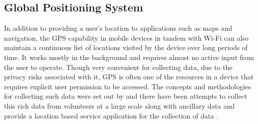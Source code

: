 \subsection{Global Positioning System}

In addition to providing a user’s location to applications such as maps and navigation, the GPS capability in mobile devices in tandem with Wi-Fi can also maintain a continuous list of locations visited by the device over long periods of time.
It works mostly in the background and requires almost no active input from the user to operate.
Though very convenient for collecting data, due to the privacy risks associated with it, GPS is often one of the resources in a device that requires explicit user permission to be accessed.
The concepts and methodologies for collecting such data were set out by \citep{asakura2004} and there have been attempts to collect this rich data from volunteers at a large scale along with ancillary data \citep{kiukkonen2010} and provide a location based service application for the collection of data \citep{ratti2006, jiang2006, ahas2005}.
 
